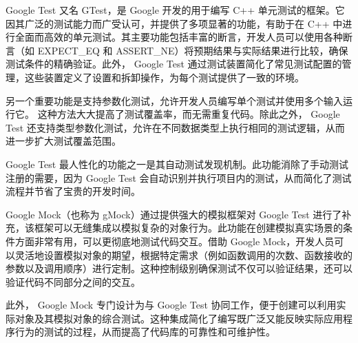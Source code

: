 Google Test 又名 GTest，是 Google 开发的用于编写 C++ 单元测试的框架。它因其广泛的测试能力而广受认可，并提供了多项显著的功能，有助于在 C++ 中进行全面而高效的单元测试。其主要功能包括丰富的断言，开发人员可以使用各种断言（如 EXPECT\_EQ 和 ASSERT\_NE）将预期结果与实际结果进行比较，确保测试条件的精确验证。此外， Google Test 通过测试装置简化了常见测试配置的管理，这些装置定义了设置和拆卸操作，为每个测试提供了一致的环境。

另一个重要功能是支持参数化测试，允许开发人员编写单个测试并使用多个输入运行它。
这种方法大大提高了测试覆盖率，而无需重复代码。除此之外， Google Test 还支持类型参数化测试，允许在不同数据类型上执行相同的测试逻辑，从而进一步扩大测试覆盖范围。

Google Test 最人性化的功能之一是其自动测试发现机制。此功能消除了手动测试注册的需要，因为 Google Test 会自动识别并执行项目内的测试，从而简化了测试流程并节省了宝贵的开发时间。

Google Mock（也称为 gMock）通过提供强大的模拟框架对 Google Test 进行了补充，该框架可以无缝集成以模拟复杂的对象行为。此功能在创建模拟真实场景的条件方面非常有用，可以更彻底地测试代码交互。借助 Google Mock，开发人员可以灵活地设置模拟对象的期望，根据特定需求（例如函数调用的次数、函数接收的参数以及调用顺序）进行定制。这种控制级别确保测试不仅可以验证结果，还可以验证代码不同部分之间的交互。

此外， Google Mock 专门设计为与 Google Test 协同工作，便于创建可以利用实际对象及其模拟对象的综合测试。这种集成简化了编写既广泛又能反映实际应用程序行为的测试的过程，从而提高了代码库的可靠性和可维护性。